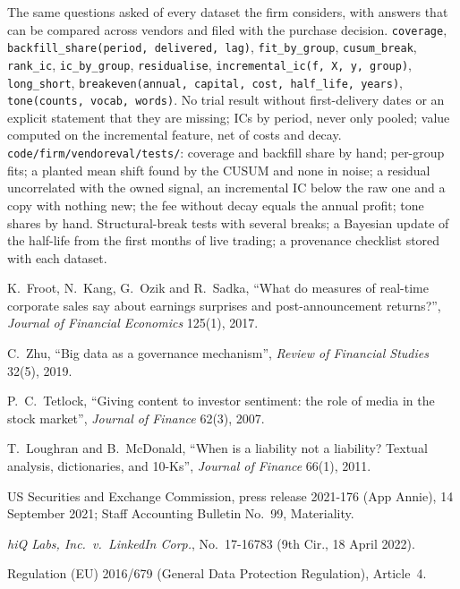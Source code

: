 \begin{build}
 The same questions asked of every dataset the firm considers, with answers that can be compared across vendors and filed with
the purchase decision.
 \texttt{coverage}, \texttt{backfill\_share(period, delivered, lag)}, \texttt{fit\_by\_group}, \texttt{cusum\_break},
\texttt{rank\_ic}, \texttt{ic\_by\_group}, \texttt{residualise}, \texttt{incremental\_ic(f, X, y, group)}, \texttt{long\_short},
\texttt{breakeven(annual, capital, cost, half\_life, years)}, \texttt{tone(counts, vocab, words)}.
 No trial result without first-delivery dates or an explicit statement that they are missing; ICs by period, never only pooled;
value computed on the incremental feature, net of costs and decay.
 \texttt{code/firm/vendoreval/tests/}: coverage and backfill share by hand; per-group fits; a planted mean shift found by
the CUSUM and none in noise; a residual uncorrelated with the owned signal, an incremental IC below the raw one and a copy with nothing new; the
fee without decay equals the annual profit; tone shares by hand.
 Structural-break tests with several breaks; a Bayesian update of the half-life from the first months of live trading; a
provenance checklist stored with each dataset.
\end{build}

\begin{omsources}
\item K.~Froot, N.~Kang, G.~Ozik and R.~Sadka, ``What do measures of real-time corporate sales say about earnings surprises and post-announcement
returns?'', \emph{Journal of Financial Economics} 125(1), 2017.
\item C.~Zhu, ``Big data as a governance mechanism'', \emph{Review of Financial Studies} 32(5), 2019.
\item P.~C.~Tetlock, ``Giving content to investor sentiment: the role of media in the stock market'', \emph{Journal of Finance} 62(3), 2007.
\item T.~Loughran and B.~McDonald, ``When is a liability not a liability? Textual analysis, dictionaries, and 10-Ks'', \emph{Journal of Finance}
66(1), 2011.
\item US Securities and Exchange Commission, press release 2021-176 (App Annie), 14 September 2021; Staff Accounting Bulletin No.~99,
Materiality.
\item \emph{hiQ Labs, Inc.\ v.\ LinkedIn Corp.}, No.~17-16783 (9th Cir., 18 April 2022).
\item Regulation (EU) 2016/679 (General Data Protection Regulation), Article~4.
\end{omsources}

